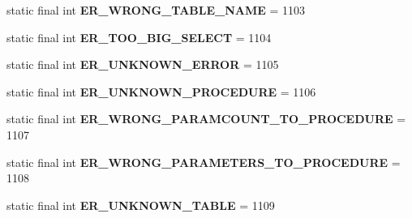 \begin{DoxyCompactItemize}
\mbox{\label{classcom_1_1mysql_1_1cj_1_1exceptions_1_1_mysql_error_numbers_a8dfd11bb220f49714a4b19919d063006}} 
static final int {\bfseries E\+R\+\_\+\+W\+R\+O\+N\+G\+\_\+\+T\+A\+B\+L\+E\+\_\+\+N\+A\+ME} = 1103
\item 
\mbox{\label{classcom_1_1mysql_1_1cj_1_1exceptions_1_1_mysql_error_numbers_ab860e3b236d2bf339acb801861b388b4}} 
static final int {\bfseries E\+R\+\_\+\+T\+O\+O\+\_\+\+B\+I\+G\+\_\+\+S\+E\+L\+E\+CT} = 1104
\item 
\mbox{\label{classcom_1_1mysql_1_1cj_1_1exceptions_1_1_mysql_error_numbers_a96042321adb71cec9ef0460bd7e29fb9}} 
static final int {\bfseries E\+R\+\_\+\+U\+N\+K\+N\+O\+W\+N\+\_\+\+E\+R\+R\+OR} = 1105
\item 
\mbox{\label{classcom_1_1mysql_1_1cj_1_1exceptions_1_1_mysql_error_numbers_af2c5a121633709051dd77dc79e33f814}} 
static final int {\bfseries E\+R\+\_\+\+U\+N\+K\+N\+O\+W\+N\+\_\+\+P\+R\+O\+C\+E\+D\+U\+RE} = 1106
\item 
\mbox{\label{classcom_1_1mysql_1_1cj_1_1exceptions_1_1_mysql_error_numbers_a9c97d0478a612be06060ada0ece31a39}} 
static final int {\bfseries E\+R\+\_\+\+W\+R\+O\+N\+G\+\_\+\+P\+A\+R\+A\+M\+C\+O\+U\+N\+T\+\_\+\+T\+O\+\_\+\+P\+R\+O\+C\+E\+D\+U\+RE} = 1107
\item 
\mbox{\label{classcom_1_1mysql_1_1cj_1_1exceptions_1_1_mysql_error_numbers_a7d438d9aaad39e3f54f0638635d94896}} 
static final int {\bfseries E\+R\+\_\+\+W\+R\+O\+N\+G\+\_\+\+P\+A\+R\+A\+M\+E\+T\+E\+R\+S\+\_\+\+T\+O\+\_\+\+P\+R\+O\+C\+E\+D\+U\+RE} = 1108
\item 
\mbox{\label{classcom_1_1mysql_1_1cj_1_1exceptions_1_1_mysql_error_numbers_a0535181569c6219b387aac61a7c433f4}} 
static final int {\bfseries E\+R\+\_\+\+U\+N\+K\+N\+O\+W\+N\+\_\+\+T\+A\+B\+LE} = 1109
\item 

\end{DoxyCompactItemize}
